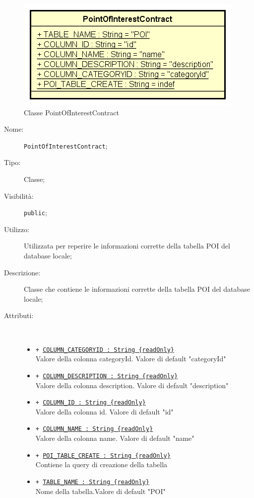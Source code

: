 \documentclass[../DefinizioneDiProdotto.tex]{subfiles}
\begin{document}
    \begin{figure}[H]
        \centering
        \includegraphics{img/PointOfInterestContract.png}
        \caption{Classe PointOfInterestContract}\label{fig:model::dataaccess::dao::PointOfInterestContract} 
    \end{figure}
    \begin{description}
\item[Nome:] \texttt{PointOfInterestContract};
\item[Tipo:] Classe;
\item[Visibilità:] \texttt{public};
\item[Utilizzo:] Utilizzata per reperire le informazioni corrette della tabella POI del database locale;
\item[Descrizione:] Classe che contiene le informazioni corrette della tabella POI del database locale;
\item[Attributi:] \
\begin{itemize}
\item \texttt{+ \underline{COLUMN\_CATEGORYID : String \{readOnly\}}}\\
Valore della colonna categoryId. Valore di default "categoryId"

\item \texttt{+ \underline{COLUMN\_DESCRIPTION : String \{readOnly\}}}\\
Valore della colonna description. Valore di default "description"

\item \texttt{+ \underline{COLUMN\_ID : String \{readOnly\}}}\\
Valore della colonna id. Valore di default "id"

\item \texttt{+ \underline{COLUMN\_NAME : String \{readOnly\}}}\\
Valore della colonna name. Valore di default "name"

\item \texttt{+ \underline{POI\_TABLE\_CREATE : String \{readOnly\}}}\\
Contiene la query di creazione della tabella

\item \texttt{+ \underline{TABLE\_NAME : String \{readOnly\}}}\\
Nome della tabella.Valore di default "POI"

\end{itemize}
\end{description}
\end{document}
